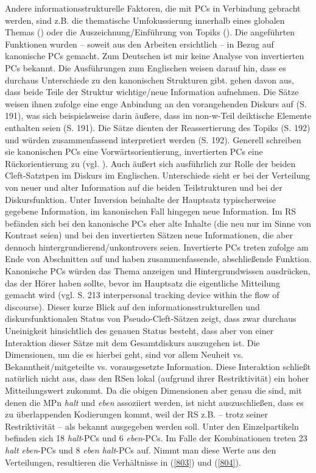 Andere informationsstrukturelle Faktoren, die mit PCs in Verbindung gebracht werden, sind z.B. die thematische Umfokussierung innerhalb eines globalen Themas (\citealt[75]{Guenthner2006}) oder die Auszeichnung/Einführung von Topiks (\citealt[186, 196]{Weinert1996}). Die angeführten Funktionen wurden – soweit aus den Arbeiten ersichtlich – in Bezug auf kanonische PCs gemacht. Zum Deutschen ist mir keine Analyse von invertierten PCs bekannt. Die Ausführungen zum Eng\-lischen weisen darauf hin, dass es durchaus Unterschiede zu den kanoni\-schen Strukturen gibt. \citet[190]{Weinert1996} gehen davon aus, dass beide Teile der Struktur wichtige/neue Information aufnehmen. Die Sätze weisen ihnen zufolge eine enge Anbindung an den vorangehenden Diskurs auf (S. 191), was sich beispielsweise darin äußere, dass im non-w-Teil deiktische Elemente enthalten seien (S. 191). Die Sätze dienten der Reassertierung des Topiks (S. 192) und würden zusammenfassend interpretiert werden (S. 192). Generell schreiben sie kanoni\-schen PCs eine Vorwärtsorientierung, invertierten PCs eine Rückorientierung zu (vgl. \citealt[199]{Weinert1996}). Auch \citet[120, 145, Kapitel 6.1, 6.2]{Collins1991} äußert sich ausführlich zur Rolle der beiden Cleft-Satztpen im Diskurs im Eng\-lischen. Unterschiede sieht er bei der Verteilung von neuer und alter Information auf die beiden Teilstrukturen und bei der Diskursfunktion. Unter Inversion beinhalte der Hauptsatz typischerweise gegebene Information, im kanonischen Fall hingegen neue Information. Im RS befänden sich bei den kanonische PCs eher alte Inhalte (die neu nur im Sinne von Kontrast seien) und bei den invertierten Sätzen neue Informationen, die aber dennoch hintergrundierend/unkontrovers seien. Invertierte PCs treten \citet{Collins1991} zufolge am Ende von Abschnitten auf und haben zusammenfassende, abschließende Funktion. Kanonische PCs würden das Thema anzeigen und Hintergrundwissen ausdrücken, das der Hörer haben sollte, bevor im Hauptsatz die eigentliche Mitteilung gemacht wird (vgl. S. 213 \glqq interpersonal \glq tracking\grq {} device within the flow of discourse\grqq{}). Dieser kurze Blick auf den informationsstrukturellen und diskursfunktionalen Status von Pseudo-Cleft-Sätzen zeigt, dass zwar durchaus Uneinigkeit hinsichtlich des genauen Status besteht, dass aber von einer Interaktion dieser Sätze mit dem Gesamtdiskurs auszugehen ist. Die Dimensionen, um die es hierbei geht, sind vor allem Neuheit vs. Bekanntheit/mitgeteilte vs. vorausgesetzte Information. Diese Interaktion schließt natürlich nicht aus, dass den RSen lokal (aufgrund ihrer Restriktivität) ein hoher Mitteilungswert zukommt. Da die obigen Dimensionen aber genau die sind, mit denen die MPn \textit{halt} und \textit{eben} assoziiert werden, ist nicht auszuschließen, dass es zu überlappenden Kodierungen kommt, weil der RS z.B. – trotz seiner Restriktivität – als bekannt ausgegeben werden soll. Unter den Einzelpartikeln befinden sich 18 \textit{halt}-PCs und 6 \textit{eben}-PCs. Im Falle der Kombinationen treten 23 \textit{halt eben}-PCs und 8 \textit{eben halt}-PCs auf. Nimmt man diese Werte aus den Verteilungen, resultieren die Verhältnisse in (\ref{803}) und (\ref{804}).

